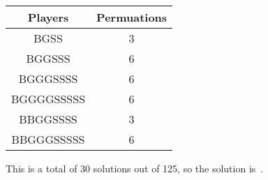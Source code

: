 \documentclass{article}
\begin{document}
\vspace{0.1in}
\begin{center}
\begin{tabular}{c c}
Players & Permuations \\
\hline
BGSS       & 3 \\
BGGSSS     & 6 \\
BGGGSSSS   & 6 \\
BGGGGSSSSS & 6 \\
BBGGSSSS   & 3 \\
BBGGGSSSSS & 6 \\
\end{tabular}
\end{center}
\vspace{0.1in}

This is a total of 30 solutions out of 125, so the solution is
\,.
\end{document}
